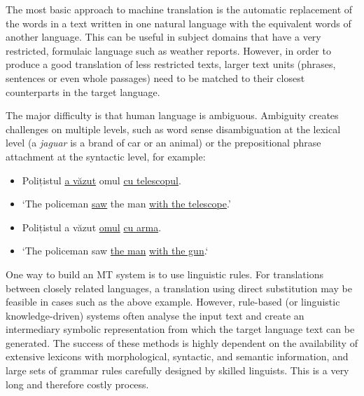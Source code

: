 \begin{multicols}{2}
The most basic approach to machine translation is the automatic replacement of the words in a text written in one natural language with the equivalent words of another language. This can be useful in subject domains that have a very restricted, formulaic language such as weather reports.
However, in order to produce a good translation of less restricted texts, larger text units (phrases, sentences or even whole passages) need to be matched to their closest counterparts in the target language.


The major difficulty is that human language is ambiguous. Ambiguity creates challenges on multiple levels, such as word sense disambiguation at the lexical level (a \textit{jaguar} is a brand of car or an animal) or the prepositional phrase attachment at the syntactic level, for example:

\begin{example}
\begin{itemize}
\item []Polițistul \underline{a văzut} omul \underline{cu telescopul}.
\item []`The policeman \underline{saw} the man \underline{with the telescope}.'
\end{itemize}
\end{example}

\begin{example}
\begin{itemize}
\item []Polițistul a văzut \underline{omul} \underline{cu arma}.
\item []`The policeman saw \underline{the man} \underline{with the gun}.`
\end{itemize}
\end{example}

One way to build an MT system is to use linguistic rules. For translations between closely related languages, a translation using direct substitution may be feasible in cases such as the above example. However, rule-based (or linguistic knowledge-driven) systems often analyse the input text and create an intermediary symbolic representation from which the target language text can be generated. The success of these methods is highly dependent on the availability of extensive lexicons with morphological, syntactic, and semantic information, and large sets of grammar rules carefully designed by skilled linguists. This is a very long and therefore costly process.


\end{multicols}
